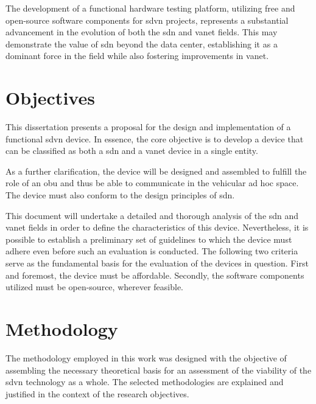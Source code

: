 The development of a functional hardware testing platform, utilizing free and open-source software components for \gls{sdvn} projects, represents a substantial advancement in the evolution of both the \gls{sdn} and \gls{vanet} fields. This may demonstrate the value of \gls{sdn} beyond the data center, establishing it as a dominant force in the field while also fostering improvements in \gls{vanet}.


\section{Objectives} %
\label{sec:objectives}

This dissertation presents a proposal for the design and implementation of a functional \gls{sdvn} device. In essence, the core objective is to develop a device that can be classified as both a \gls{sdn} and a \gls{vanet} device in a single entity. 

As a further clarification, the device will be designed and assembled to fulfill the role of an \gls{obu} and thus be able to communicate in the  vehicular ad hoc space. The device must also conform to the design principles of \gls{sdn}.

This document will undertake a detailed and thorough analysis of the \gls{sdn} and \gls{vanet} fields in order to define the characteristics of this device. Nevertheless, it is possible to establish a preliminary set of guidelines to which the device must adhere even before such an evaluation is conducted. The following two criteria serve as the fundamental basis for the evaluation of the devices in question. First and foremost, the device must be affordable. Secondly, the software components utilized must be open-source, wherever feasible.


\section{Methodology} %
\label{sec:methodology}

The methodology employed in this work was designed with the objective of assembling the necessary theoretical basis for an assessment of the viability of the \gls{sdvn} technology as a whole. The selected methodologies are explained and justified in the context of the research objectives.

